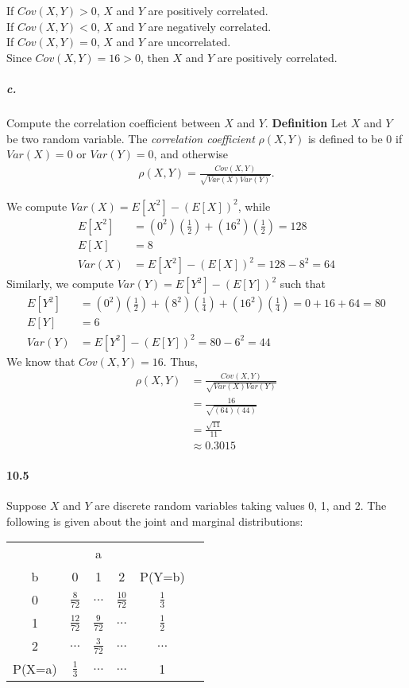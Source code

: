 \documentclass{article} %
\begin{document}
If $Cov(X, Y) > 0$, $X$ and $Y$ are positively correlated. \\
If $Cov(X, Y) < 0$, $X$ and $Y$ are negatively correlated. \\
If $Cov(X, Y) = 0$, $X$ and $Y$ are uncorrelated. \\
Since $Cov(X, Y) = 16 > 0$, then $X$ and $Y$ are positively correlated. 

\subparagraph*{c.} Compute the correlation coefficient between $X$ and $Y$. 
{\bf Definition} Let $X$ and $Y$ be two random variable. The {\it correlation coefficient} $\rho(X, Y)$ is defined to be 0 if $Var(X) = 0$ or $Var(Y) = 0$, and otherwise 
\begin{align*}
\rho(X, Y) = \frac{Cov(X, Y)}{\sqrt{Var(X)Var(Y)}}.
\end{align*}

We compute $Var(X) = E[X^2] - \left( E[X]\right) ^2$, while 
\begin{align*}
E[X^2] &  = (0^2)(\frac{1}{2}) + (16^2) (\frac{1}{2}) = 128 \\
E[X] & = 8 \\
Var(X) & =  E[X^2] - \left( E[X]\right) ^2 = 128 - 8^2 = 64 
\end{align*} 
Similarly, we compute $Var(Y) = E[Y^2] - \left( E[Y]\right) ^2$ such that
\begin{align*}
E[Y^2] &  = (0^2)(\frac{1}{2}) + (8^2) (\frac{1}{4}) + (16^2)(\frac{1}{4}) = 0 + 16 + 64 = 80\\
E[Y] & = 6 \\
Var(Y) & =  E[Y^2] - \left( E[Y]\right) ^2 = 80 - 6^2 = 44 
\end{align*} 
We know that $Cov(X, Y) = 16$. Thus, 
\begin{align*}
\rho(X, Y) & = \frac{Cov(X, Y)}{\sqrt{Var(X)Var(Y)}} \\
& = \frac{16}{\sqrt{(64)(44)}} \\
& = \frac{\sqrt{11}}{11} \\
& \approx 0.3015
\end{align*}

\paragraph*{10.5} Suppose $X$ and $Y$ are discrete random variables taking values 0, 1, and 2. The following is given about the joint and marginal distributions:
\begin{table}[h!]
\centering
\renewcommand{\arraystretch}{1.5}
\begin{tabular}{cccccc}
\hline \hline 
 &  \multicolumn{3}{c}{a} \\ \cline{2-4} 
b & 0 & 1 & 2 & P(Y=b) \\ \hline
0 & $\frac{8}{72}$ & $\ldots$ & $\frac{10}{72}$ & $\frac{1}{3}$ \\ 
1 & $\frac{12}{72}$ & $\frac{9}{72}$ & $\ldots$ & $\frac{1}{2}$ \\  
2 & $\ldots$ & $\frac{3}{72}$ & $\ldots$ & $\ldots$ \\ \hline
P(X=a) & $\frac{1}{3}$ & $\ldots$ & $\ldots$ & 1 \\ \hline \hline
\end{tabular}
\end{table}
\end{document}
